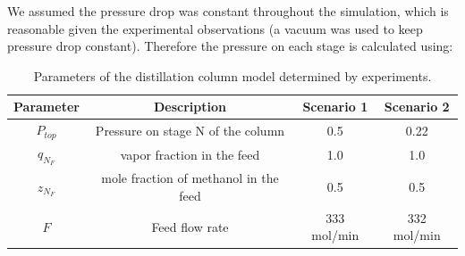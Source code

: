 

We assumed the pressure drop was constant throughout the simulation, which is reasonable given the experimental observations (a vacuum was used to keep pressure drop constant). Therefore the pressure on each stage is calculated using:

\begin{table}
    \centering
    \caption{Parameters of the distillation column model determined by experiments.}
    \begin{tabular}{cccc}
        \textbf{Parameter} & \textbf{Description} & \textbf{Scenario 1} & \textbf{Scenario 2}  \\
        \hline
         $P_{top}$ &  Pressure on stage N of the column &  0.5 & 0.22 \\ 
         $q_{N_F}$ & vapor fraction  in the feed & 1.0 & 1.0 \\
         $z_{N_F}$  & mole fraction of methanol in the feed &  0.5  & 0.5 \\
         $F$ & Feed flow rate &  333 mol/min  & 332 mol/min \\
         \hline
    \end{tabular}
    \label{tab:parameters}
\end{table}

